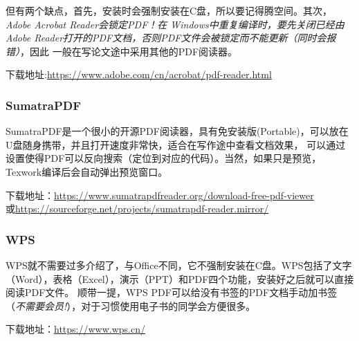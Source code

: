 但有两个缺点，首先，安装时会强制安装在C盘，所以要记得腾空间。其次，\emph{Adobe Acrobat Reader会锁定PDF！在
Windows中重复编译时，要先关闭已经由Adobe Reader打开的PDF文档，否则PDF文件会被锁定而不能更新（同时会报错）}，因此
一般在写论文途中采用其他的PDF阅读器。

下载地址:\url{https://www.adobe.com/cn/acrobat/pdf-reader.html}


\subsubsection{SumatraPDF}


SumatraPDF是一个很小的开源PDF阅读器，具有免安装版(Portable)，可以放在U盘随身携带，并且打开速度非常快，适合在写作途中查看文档效果，
可以通过设置使得PDF可以反向搜索（定位到对应的代码）。当然，如果只是预览，Texwork编译后会自动弹出预览窗口。

下载地址：\url{https://www.sumatrapdfreader.org/download-free-pdf-viewer}\\或\url{https://sourceforge.net/projects/sumatrapdf-reader.mirror/}



\subsubsection{WPS}


WPS就不需要过多介绍了，与Office不同，它不强制安装在C盘。WPS包括了文字（Word），表格（Excel），演示（PPT）和PDF四个功能，安装好之后就可以直接阅读PDF文件。
顺带一提，WPS PDF可以给没有书签的PDF文档手动加书签（\emph{不需要会员!}），对于习惯使用电子书的同学会方便很多。

下载地址：\url{https://www.wps.cn/}